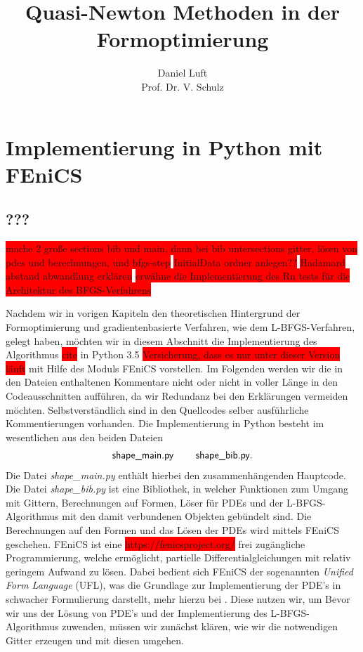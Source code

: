 \documentclass[bibliography=totoc,12pt,a4paper]{scrartcl}
\theoremstyle{exampstyle}
\numberwithin{equation}{section}
\begin{document}
\title{Quasi-Newton Methoden in der Formoptimierung}

\author{Daniel Luft \\ Prof. Dr. V. Schulz}

  \pagestyle{empty}

  \pagestyle{headings}
  

\section{Implementierung in Python mit FEniCS}
\subsection{???}

\colorbox{red}{mache 2 große sections bib und main, dann bei bib untersections gitter, lösen von pdes und berechnungen, und bfgs-step}
\colorbox{red}{InitialData ordner anlegen??}
\colorbox{red}{Hadamard abstand abwandlung erklären}
\colorbox{red}{erwähne die Implementierung des Rn tests für die Architektur des BFGS-Verfahrens}

Nachdem wir in vorigen Kapiteln den theoretischen Hintergrund der Formoptimierung und gradientenbasierte Verfahren, wie dem L-BFGS-Verfahren, gelegt haben, möchten wir in diesem Abschnitt die Implementierung des Algorithmus \colorbox{red}{cite} in Python 3.5 \colorbox{red}{Versicherung, dass es nur unter dieser Version läuft} mit Hilfe des Moduls FEniCS vorstellen. Im Folgenden werden wir die in den Dateien enthaltenen Kommentare nicht oder nicht in voller Länge in den Codeausschnitten aufführen, da wir Redundanz bei den Erklärungen vermeiden möchten. Selbstverständlich sind in den Quellcodes selber ausführliche Kommentierungen vorhanden. Die Implementierung in Python besteht im wesentlichen aus den beiden Dateien
\begin{align*}
\textsf{shape\_main.py} \hspace{0.8cm} \textsf{shape\_bib.py}.
\end{align*}
Die Datei \textit{shape\_main.py} enthält hierbei den zusammenhängenden Hauptcode. Die Datei \textit{shape\_bib.py} ist eine Bibliothek, in welcher Funktionen zum Umgang mit Gittern, Berechnungen auf Formen, Löser für PDEs und der L-BFGS-Algorithmus mit den damit verbundenen Objekten gebündelt sind. Die Berechnungen auf den Formen und das Lösen der PDEs wird mittels FEniCS geschehen.
FEniCS ist eine \colorbox{red}{https://fenicsproject.org/} frei zugängliche Programmierung, welche ermöglicht, partielle Differentialgleichungen mit relativ geringem Aufwand zu lösen. Dabei bedient sich FEniCS der sogenannten \textit{Unified Form Language} (UFL), was die Grundlage zur Implementierung der PDE's in schwacher Formulierung darstellt, mehr hierzu bei \cite{Unifiedformlanguage}. Diese nutzen wir, um 
Bevor wir uns der Lösung von PDE's und der Implementierung des L-BFGS-Algorithmus zuwenden, müssen wir zunächst klären, wie wir die notwendigen Gitter erzeugen und mit diesen umgehen.
\end{document}
